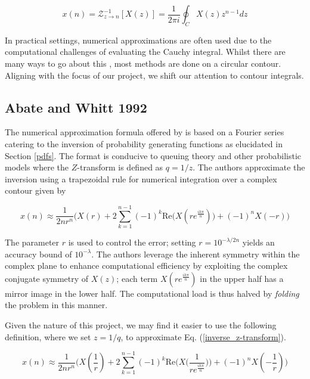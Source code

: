 \documentclass[a4paper]{report}
\begin{document}
\begin{equation}\label{inverse_z-transform}
	x(n) = \mathcal{Z}^{-1}_{z \rightarrow n}[X(z)] = \frac{1}{2\pi i} \oint_C X(z)z^{n-1}dz
\end{equation}

In practical settings, numerical approximations are often used due to the computational challenges of evaluating the Cauchy integral. Whilst there are many ways to go about this \citep{merrikh2014linearsys,rajkovic2004method,horvath2020numerical}, most methods are done on a circular contour. Aligning with the focus of our project, we shift our attention to contour integrals.

\subsection{Abate and Whitt 1992}\label{abate_whitt_section}
The numerical approximation formula offered by \citet{AbateWhitt1992a, AbateWhitt1992b} is based on a Fourier series catering to the inversion of probability generating functions as elucidated in Section \ref{pdfs}. The format is conducive to queuing theory and other probabilistic models where the $Z$-transform is defined as $q = 1 / z$. The authors approximate the inversion using a trapezoidal rule for numerical integration over a complex contour given by

\begin{equation}\label{aw_inversion_original}
	x(n) \approx \frac{1}{2nr^n} \biggr( X(r) + 2\sum^{n-1}_{k = 1} (-1)^k \mathrm{Re}\bigg( X(re^{\frac{ik\pi}{n}})\bigg) + (-1)^nX(-r) \biggl)
\end{equation}

The parameter $r$ is used to control the error; setting $r = 10^{-\lambda / 2n}$ yields an accuracy bound of $10^{-\lambda}$. The authors leverage the inherent symmetry within the complex plane to enhance computational efficiency by exploiting the complex conjugate symmetry of $X(z)$; each term $X(re^{\frac{ik\pi}{n}})$ in the upper half has a mirror image in the lower half. The computational load is thus halved by \textit{folding} the problem in this manner.

Given the nature of this project, we may find it easier to use the following definition, where we set $z = 1 / q$, to approximate Eq. (\ref{inverse_z-transform}).

\begin{equation}\label{aw_inversion}
	x(n) \approx \frac{1}{2nr^n} \biggr( X(\frac{1}{r}) + 2\sum^{n-1}_{k = 1} (-1)^k \text{Re}\bigg( X\big(\frac{1}{re^{\frac{ik\pi}{n}}}\big)\bigg) + (-1)^nX(-\frac{1}{r}) \biggl)
\end{equation}
\end{document}
